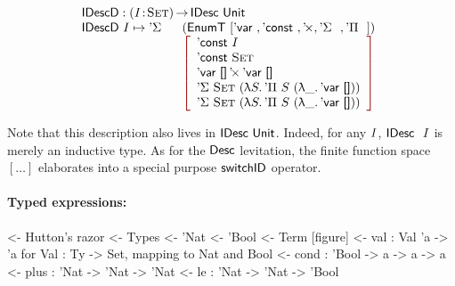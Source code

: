 \[\stk{
\IDescD : \PI{\V{I}}{\Set} \IDesc{\Unit} \\
\begin{array}{@{}ll}
\IDescD~I \mapsto \DSigma{}{} & (\EnumT \red{[} \DVar{},
                                          \DConst{},
                                          \DProd{}{},
                                          \DSigma{}{}, 
                                          \DPi{}{} \red{]}) \\
                              & \bigRedBracket{\begin{array}{l}
                                      \DConst{I}                  \\
                                      \DConst{\Set}               \\
                                      \DProd{\DVar{\Void}}{\DVar{\Void}}  \\
                                      \DSigma{\Set}{(\LAM{S} \DPi{S}{(\LAM{\_} \DVar{\Void})})} \\
                                      \DSigma{\Set}{(\LAM{S} \DPi{S}{(\LAM{\_} \DVar{\Void})})}
                                   \end{array}
                             }
\end{array}
}\]

Note that this description also lives in $\IDesc{\Unit}$. Indeed,
for any $\V{I}$, $\IDesc~\V{I}$ is merely an inductive type. As for the
$\Desc$ levitation, the finite function space $[ \ldots ]$ elaborates into a
special purpose $\F{switchID}$ operator. 

\paragraph{Typed expressions:}

\begin{wstructure}
<- Hutton's razor
    <- Types
        <- 'Nat
        <- 'Bool
    <- Term [figure]
        <- val : Val 'a -> 'a  for Val : Ty -> Set, mapping to Nat and Bool
        <- cond : 'Bool -> a -> a -> a
        <- plus : 'Nat -> 'Nat -> 'Nat
        <- le : 'Nat -> 'Nat -> 'Bool
\end{wstructure}

\newcommand{\Ty}{\C{Ty}}
\newcommand{\Ebool}{\etag{\CN{bool}}}
\newcommand{\Enat}{\etag{\CN{nat}}}
\newcommand{\Epolym}{\etag{\alpha}}

\newcommand{\Eval}[1]{\etag{\CN{val}}~#1}
\newcommand{\Econd}[3]{\etag{\CN{cond}}~#1~#2~#3}
\newcommand{\Eplus}[2]{\etag{\CN{plus}}~#1~#2}
\newcommand{\Ele}[2]{\etag{\CN{le}}~#1~#2}

